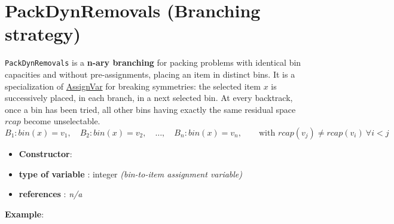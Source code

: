 \section{PackDynRemovals (Branching strategy)}\label{packdynremovals:packdynremovalsbranchstrat}\hypertarget{packdynremovals:packdynremovalsbranchstrat}{}
\begin{notedef}
  \texttt{PackDynRemovals} is a \textbf{n-ary branching} for packing problems with identical bin capacities and without pre-assignments, placing an item in distinct bins. It is a specialization of \hyperlink{assignvar:assignvarbranchstrat}{AssignVar} for breaking symmetries: 
the selected item $x$ is successively placed, in each branch, in a next selected bin. At every backtrack, once a bin has been tried, all other bins having exactly the same residual space $rcap$ become unselectable.
$$B_1: bin(x)=v_1,\quad B_2: bin(x)=v_2,\quad \ldots,\quad B_n: bin(x)=v_n,\qquad\text{with } rcap(v_j)\neq rcap(v_i)\ \forall i<j$$
\end{notedef}

\begin{itemize}
	\item \textbf{Constructor}:
	\item \textbf{type of variable} : integer \emph{(bin-to-item assignment variable)}
	\item \textbf{references} : \emph{n/a}
\end{itemize}

\textbf{Example}:
%

